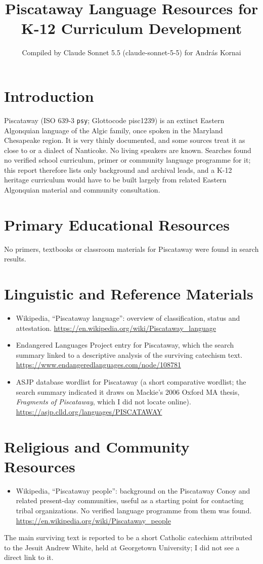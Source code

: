 \documentclass[12pt]{article}
\title{Piscataway Language Resources for K-12 Curriculum Development}
\author{Compiled by Claude Sonnet 5.5 (claude-sonnet-5-5) for Andr\'as Kornai}
\date{}
\begin{document}
\maketitle

\section{Introduction}
Piscataway (ISO 639-3 \texttt{psy}; Glottocode pisc1239) is an extinct Eastern Algonquian language of the Algic family, once spoken in the Maryland Chesapeake region. It is very thinly documented, and some sources treat it as close to or a dialect of Nanticoke. No living speakers are known. Searches found no verified school curriculum, primer or community language programme for it; this report therefore lists only background and archival leads, and a K-12 heritage curriculum would have to be built largely from related Eastern Algonquian material and community consultation.

\section{Primary Educational Resources}
No primers, textbooks or classroom materials for Piscataway were found in search results.

\section{Linguistic and Reference Materials}
\begin{itemize}
\item Wikipedia, ``Piscataway language'': overview of classification, status and attestation. \url{https://en.wikipedia.org/wiki/Piscataway_language}
\item Endangered Languages Project entry for Piscataway, which the search summary linked to a descriptive analysis of the surviving catechism text. \url{https://www.endangeredlanguages.com/node/108781}
\item ASJP database wordlist for Piscataway (a short comparative wordlist; the search summary indicated it draws on Mackie's 2006 Oxford MA thesis, \emph{Fragments of Piscataway}, which I did not locate online). \url{https://asjp.clld.org/languages/PISCATAWAY}
\end{itemize}

\section{Religious and Community Resources}
\begin{itemize}
\item Wikipedia, ``Piscataway people'': background on the Piscataway Conoy and related present-day communities, useful as a starting point for contacting tribal organizations. No verified language programme from them was found. \url{https://en.wikipedia.org/wiki/Piscataway_people}
\end{itemize}
The main surviving text is reported to be a short Catholic catechism attributed to the Jesuit Andrew White, held at Georgetown University; I did not see a direct link to it.
\end{document}

